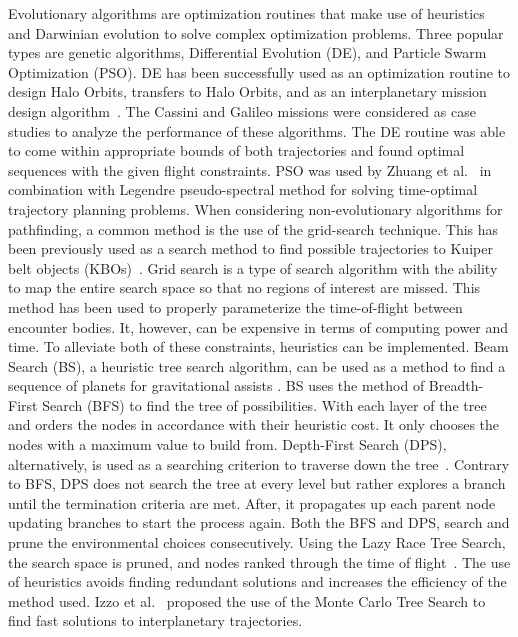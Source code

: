 \documentclass[letterpaper, preprint, paper,11pt]{AAS}	%
\begin{document}
Evolutionary algorithms are optimization routines that make use of heuristics and Darwinian evolution to solve complex optimization problems. Three popular types are genetic algorithms, Differential Evolution (DE), and Particle Swarm Optimization (PSO). DE has been successfully used as an optimization routine to design Halo Orbits, transfers to Halo Orbits, and as an interplanetary mission design algorithm~\cite{Nath2016, Olds2007}.  The Cassini and Galileo missions were considered as case studies to analyze the performance of these algorithms. The DE routine was able to come within appropriate bounds of both trajectories and found optimal sequences with the given flight constraints. PSO was used by Zhuang et al.~\cite{Zhuang2014} in combination with Legendre pseudo-spectral method for solving time-optimal trajectory planning problems. When considering non-evolutionary algorithms for pathfinding, a common method is the use of the grid-search technique. This has been previously used as a search method to find possible trajectories to Kuiper belt objects (KBOs)~\cite{Penas2019}. Grid search is a type of search algorithm with the ability to map the entire search space so that no regions of interest are missed. This method has been used to properly parameterize the time-of-flight between encounter bodies. It, however, can be expensive in terms of computing power and time. To alleviate both of these constraints, heuristics can be implemented. Beam Search (BS), a heuristic tree search algorithm, can be used as a method to find a sequence of planets for gravitational assists \cite{Penas2019}. BS uses the method of Breadth-First Search (BFS) to find the tree of possibilities. With each layer of the tree and orders the nodes in accordance with their heuristic cost. It only chooses the nodes with a maximum value to build from. Depth-First Search (DPS), alternatively, is used as a searching criterion to traverse down the tree~\cite{Izzo2013}. Contrary to BFS, DPS does not search the tree at every level but rather explores a branch until the termination criteria are met. After, it propagates up each parent node updating branches to start the process again. Both the BFS and DPS, search and prune the environmental choices consecutively. Using the Lazy Race Tree Search, the search space is pruned, and nodes ranked through the time of flight~\cite{Izzo2013}. The use of heuristics avoids finding redundant solutions and increases the efficiency of the method used. Izzo et al.~\cite{Hennes2015} proposed the use of the Monte Carlo Tree Search to find fast solutions to interplanetary trajectories.
\end{document}
